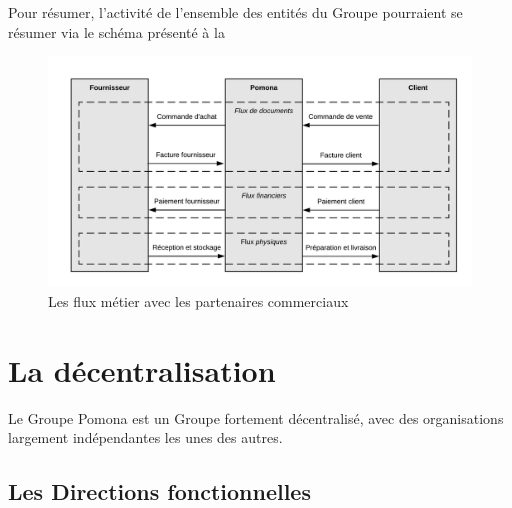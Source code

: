         Pour résumer, l'activité de l'ensemble des entités du Groupe pourraient se résumer via le schéma présenté à la 

        \begin{figure}[htbp]
            \begin{center}
            \includegraphics[width=\linewidth]{img/Les flux metier de Pomona.png}
            \end{center}
            \caption{Les flux métier avec les partenaires commerciaux}
            \label{fig:flux metier}
        \end{figure}


        \section{La décentralisation}
        
        Le Groupe Pomona est un Groupe fortement décentralisé, avec des organisations largement indépendantes les unes des autres. 

            \subsection{Les Directions fonctionnelles}

